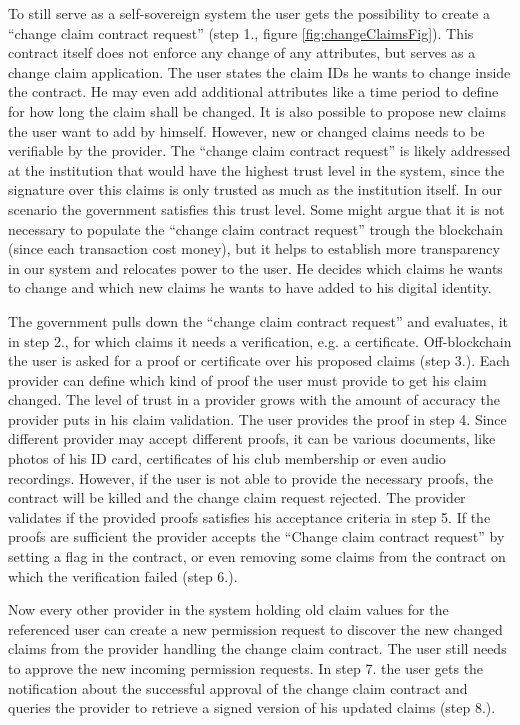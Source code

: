 To still serve as a self-sovereign system the user gets the possibility to create a “change claim contract request” (step 1., figure \ref{fig:changeClaimsFig}). This contract itself does not enforce any change of any attributes, but serves as a change claim application. The user states the claim IDs he wants to change inside the contract. He may even add additional attributes like a time period to define for how long the claim shall be changed. It is also possible to propose new claims the user want to add by himself. However, new or changed claims needs to be verifiable by the provider. The “change claim contract request” is likely addressed at the institution that would have the highest trust level in the system, since the signature over this claims is only trusted as much as the institution itself. In our scenario the government satisfies this trust level. Some might argue that it is not necessary to populate the “change claim contract request” trough the blockchain (since each transaction cost money), but it helps to establish more transparency in our system and relocates power to the user. He decides which claims he wants to change and which new claims he wants to have added to his digital identity. 

The government pulls down the “change claim contract request” and evaluates, it in step 2., for which claims it needs a verification, e.g. a certificate. Off-blockchain the user is asked for a proof or certificate over his proposed claims (step 3.). Each provider can define which kind of proof the user must provide to get his claim changed. The level of trust in a provider grows with the amount of accuracy the provider puts in his claim validation. The user provides the proof in step 4. Since different provider may accept different proofs, it can be various documents, like photos of his ID card, certificates of his club membership or even audio recordings. However, if the user is not able to provide the necessary proofs, the contract will be killed and the change claim request rejected.
The provider validates if the provided proofs satisfies his acceptance criteria in step 5.  If the proofs are sufficient the provider accepts the “Change claim contract request” by setting a flag in the contract, or even removing some claims from the contract on which the verification failed (step 6.). 

Now every other provider in the system holding old claim values for the referenced user can create a new permission request to discover the new changed claims from the provider handling the change claim contract. The user still needs to approve the new incoming permission requests. In step 7. the user gets the notification about the successful approval of the change claim contract and queries the provider to retrieve a signed version of his updated claims (step 8.). 

